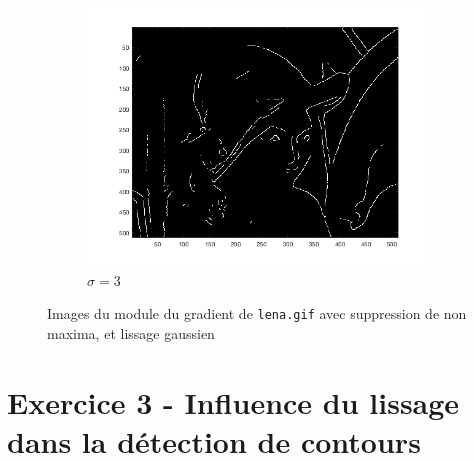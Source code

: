 \documentclass[a4paper]{article}
\begin{document}
\begin{figure}[H]
\begin{subfigure}[c]{0.3\textwidth}
        \includegraphics[width=\textwidth]{images/lena_nms_gauss3.png}
        \caption{$\sigma=3$}
    \end{subfigure}

    \caption{Images du module du gradient de \texttt{lena.gif} avec
    suppression de non maxima, et lissage gaussien}
    \label{fig:lena-nms-gauss-var}
\end{figure}

\section*{Exercice 3 - Influence du lissage dans la détection de contours}
\end{document}
